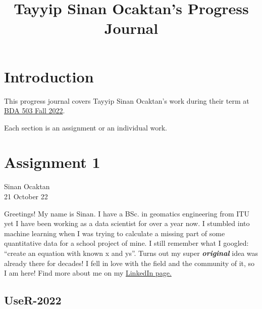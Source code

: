 \documentclass[
  letterpaper,
  DIV=11,
  numbers=noendperiod]{scrreprt}
\title{Tayyip Sinan Ocaktan's Progress Journal}
\author{}
\date{}
\renewcommand*\contentsname{Table of contents}
\newcommand\contentsname{Table of contents}
\begin{document}
\maketitle
\ifdefined\Shaded\renewenvironment{Shaded}{\begin{tcolorbox}[boxrule=0pt, interior hidden, enhanced, frame hidden, borderline west={3pt}{0pt}{shadecolor}, breakable, sharp corners]}{\end{tcolorbox}}\fi

\renewcommand*\contentsname{Table of contents}
{
\hypersetup{linkcolor=}
\setcounter{tocdepth}{2}
\tableofcontents
}

\hypertarget{introduction}{%
\chapter*{Introduction}\label{introduction}}

This progress journal covers Tayyip Sinan Ocaktan's work during their
term at \href{https://mef-bda503.github.io/fall22/}{BDA 503 Fall 2022}.

Each section is an assignment or an individual work.


\hypertarget{assignment-1}{%
\chapter{Assignment 1}\label{assignment-1}}

Sinan Ocaktan\\
21 October 22

\hfill\break

Greetings! My name is Sinan. I have a BSc. in geomatics engineering from
ITU yet I have been working as a data scientist for over a year now. I
stumbled into machine learning when I was trying to calculate a missing
part of some quantitative data for a school project of mine. I still
remember what I googled: ``create an equation with known x and ys''.
Turns out my super \textbf{\emph{original}} idea was already there for
decades! I fell in love with the field and the community of it, so I am
here! Find more about me on my
\href{https://www.linkedin.com/in/ocaktans/?locale=en_US}{LinkedIn
page.}

\hypertarget{user-2022}{%
\section{UseR-2022}\label{user-2022}}
\end{document}
